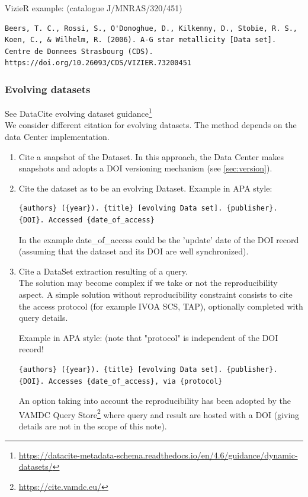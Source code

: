 \documentclass[11pt,a4paper]{ivoa}
\begin{document}
VizieR example: (catalogue J/MNRAS/320/451)
\begin{verbatim}
Beers, T. C., Rossi, S., O'Donoghue, D., Kilkenny, D., Stobie, R. S.,
Koen, C., & Wilhelm, R. (2006). A-G star metallicity [Data set]. 
Centre de Donnees Strasbourg (CDS). https://doi.org/10.26093/CDS/VIZIER.73200451
\end{verbatim}

\subsubsection{Evolving datasets}

See DataCite evolving dataset guidance\footnote{\url{https://datacite-metadata-schema.readthedocs.io/en/4.6/guidance/dynamic-datasets/}}\\

We consider different citation for evolving datasets. The method depends on the data Center implementation.

\begin{enumerate}
  \item Cite a snapshot of the Dataset. In this approach, the Data Center makes snapshots and adopts a DOI versioning mechanism (see \ref{sec:version}).
  \item  Cite the dataset as to be an evolving Dataset.
         Example in APA style:
\begin{verbatim}
{authors} ({year}). {title} [evolving Data set]. {publisher}.
{DOI}. Accessed {date_of_access}
\end{verbatim}

		In the example {date\_of\_access} could be the 'update' date of the DOI record (assuming that the dataset and its DOI are well synchronized).

	\item Cite a DataSet extraction resulting of a query.\\ 
	The solution may become complex if we take or not the reproducibility aspect.
	A simple solution without reproducibility constraint consists to cite the access protocol (for example IVOA SCS, TAP), optionally completed with query details.

	Example in APA style: (note that "protocol" is independent of the DOI record!
\begin{verbatim}
{authors} ({year}). {title} [evolving Data set]. {publisher}. 
{DOI}. Accesses {date_of_access}, via {protocol}	
\end{verbatim}

	An option taking into account the reproducibility has been adopted by the VAMDC Query Store\footnote{\url{https://cite.vamdc.eu/}} where query and result are hosted with a DOI (giving details are not in the scope of this note).
\end{enumerate}
\end{document}
